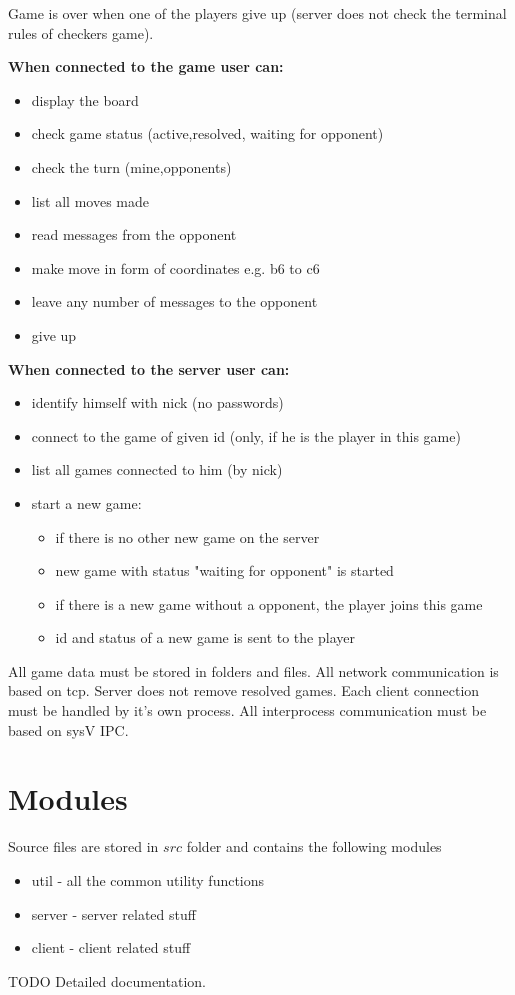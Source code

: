 \documentclass{article}
\begin{document}
Game is over when one of the players give up 
(server does not check the terminal rules of checkers game).

{\bf When connected to the game user can:}

\begin{itemize}

	\item display the board
    \item check game status (active,resolved, waiting for opponent)
	\item check the turn (mine,opponents)
	\item list all moves made
	\item read messages from the opponent
	\item make move in form of coordinates e.g. b6 to c6
	\item leave any number of messages to the opponent
	\item give up

\end{itemize}

{\bf When connected to the server user can:}

\begin{itemize}

    \item identify himself with nick (no passwords)
    \item connect to the game of given id (only, if he is the player in this game)
    \item list all games connected to him (by nick)
    \item start a new game:
    \begin{itemize}
        \item if there is no other new game on the server 
        \item new game with status "waiting for opponent" is started
        \item if there is a new game without a opponent, the player joins this game
        \item id and status of a new game is sent to the player
	\end{itemize}        
\end{itemize}

All game data must be stored in folders and files. 
All network communication is based on tcp. 
Server does not remove resolved games. 
Each client connection must be handled by it's own process. 
All interprocess communication must be based on sysV IPC.

\section{Modules}
Source files are stored in $src$ folder and contains the following modules

\begin{itemize}
	\item util - all the common utility functions
	\item server - server related stuff
	\item client - client related stuff
\end{itemize}	

TODO Detailed documentation.
\end{document}

